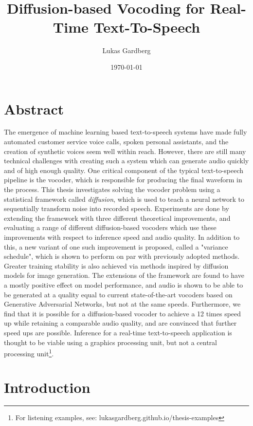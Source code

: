 \documentclass{report}
\title{Diffusion-based Vocoding for Real-Time Text-To-Speech}
\author{Lukas Gardberg}
\date{\today}
\begin{document}
\maketitle

\newpage

\chapter*{Abstract}

The emergence of machine learning based text-to-speech systems have made fully automated customer service voice calls, spoken personal assistants, and the creation of synthetic voices seem well within reach. However, there are still many technical challenges with creating such a  system which can generate audio quickly and of high enough quality. One critical component of the typical text-to-speech pipeline is the vocoder, which is responsible for producing the final waveform in the process. This thesis investigates solving the vocoder problem using a statistical framework called \textit{diffusion}, which is used to teach a neural network to sequentially transform noise into recorded speech. Experiments are done by extending the framework with three different theoretical improvements, and evaluating a range of different diffusion-based vocoders which use these improvements with respect to inference speed and audio quality. In addition to this, a new variant of one such improvement is proposed, called a "variance schedule", which is shown to perform on par with previously adopted methods. Greater training stability is also achieved via methods inspired by diffusion models for image generation. The extensions of the framework are found to have a mostly positive effect on model performance, and audio is shown to be able to be generated at a quality equal to current state-of-the-art vocoders based on Generative Adversarial Networks, but not at the same speeds. Furthermore, we find that it is possible for a diffusion-based vocoder to achieve a 12 times speed up while retaining a comparable audio quality, and are convinced that further speed ups are possible. Inference for a real-time text-to-speech application is thought to be viable using a graphics processing unit, but not a central processing unit\footnote{For listening examples, see: lukasgardberg.github.io/thesis-examples}.

\newpage

\tableofcontents

\newpage

\chapter{Introduction}
\end{document}
